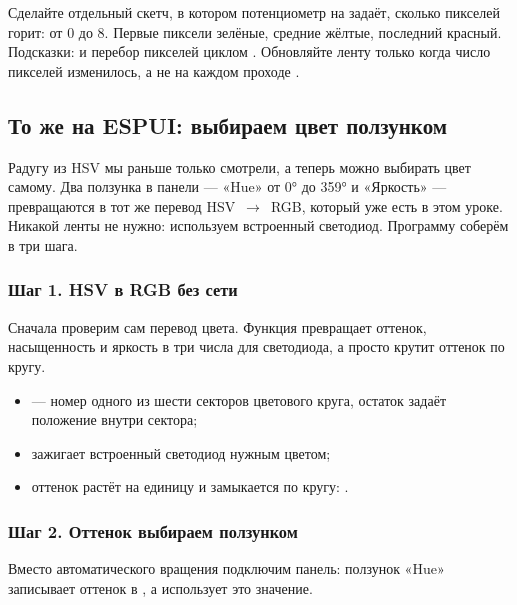 Сделайте отдельный скетч, в котором потенциометр на  задаёт, сколько пикселей горит: от 0 до 8. Первые пиксели
зелёные, средние жёлтые, последний красный. Подсказки: 
и перебор пикселей циклом . Обновляйте ленту только когда число пикселей изменилось, а не на
каждом проходе .

\subsection{То же на ESPUI: выбираем цвет ползунком}

Радугу из HSV мы раньше только смотрели, а теперь можно выбирать цвет самому. Два ползунка в
панели --- «Hue» от 0° до 359° и «Яркость» --- превращаются в тот же перевод HSV~$\to$~RGB,
который уже есть в этом уроке. Никакой ленты не нужно: используем встроенный светодиод.
Программу соберём в три шага.

\subsubsection{Шаг 1. HSV в RGB без сети}

Сначала проверим сам перевод цвета. Функция  превращает оттенок, насыщенность и
яркость в три числа для светодиода, а  просто крутит оттенок по кругу.


\begin{itemize}[leftmargin=*]
  \item {} --- номер одного из шести секторов цветового круга, остаток задаёт положение внутри сектора;
  \item {} зажигает встроенный светодиод нужным цветом;
  \item оттенок растёт на единицу и замыкается по кругу: .
\end{itemize}

\subsubsection{Шаг 2. Оттенок выбираем ползунком}

Вместо автоматического вращения подключим панель: ползунок «Hue» записывает оттенок в
, а  использует это значение.


